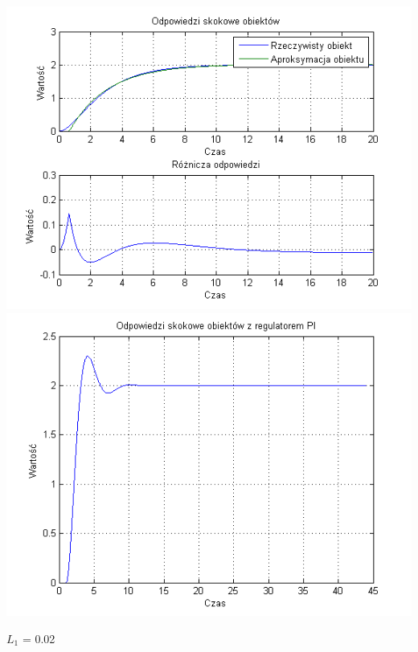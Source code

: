 \documentclass[10pt,a4paper]{article}
\begin{document}
\begin{center}
\includegraphics[scale=1]{images/jeden/skrypt_171.png}\\
\includegraphics[scale=1]{images/jeden/skrypt_172.png}\\
\end{center}
\newpage
$L_1$ = 0.02
\end{document}
